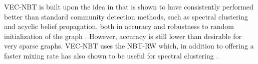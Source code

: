 \documentclass{article} %
\begin{document}
VEC-NBT is built upon the idea in \cite{NodeEmbed} that is shown to have consistently performed better than standard community detection methods, such as spectral clustering and acyclic belief propagation, both in accuracy and robustness to random initialization of the graph \cite{NodeEmbed}. However, accuracy is still lower than desirable for very sparse graphs. VEC-NBT uses the NBT-RW which, in addition to offering a faster mixing rate \cite{Alon} has also shown to be useful for spectral clustering \cite{Redemption}.


\end{document}
